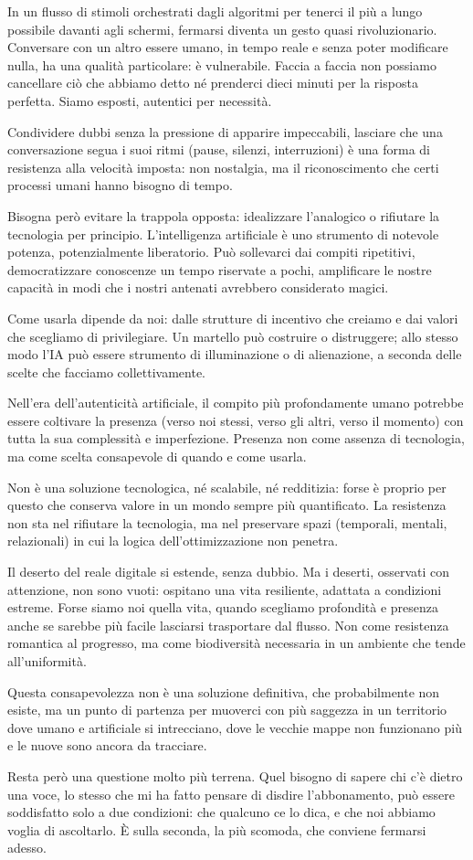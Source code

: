 In un flusso di stimoli orchestrati dagli algoritmi per tenerci il più a lungo possibile davanti agli schermi, fermarsi diventa un gesto quasi rivoluzionario. Conversare con un altro essere umano, in tempo reale e senza poter modificare nulla, ha una qualità particolare: è vulnerabile. Faccia a faccia non possiamo cancellare ciò che abbiamo detto né prenderci dieci minuti per la risposta perfetta. Siamo esposti, autentici per necessità.

Condividere dubbi senza la pressione di apparire impeccabili, lasciare che una conversazione segua i suoi ritmi (pause, silenzi, interruzioni) è una forma di resistenza alla velocità imposta: non nostalgia, ma il riconoscimento che certi processi umani hanno bisogno di tempo.

Bisogna però evitare la trappola opposta: idealizzare l'analogico o rifiutare la tecnologia per principio. L'intelligenza artificiale è uno strumento di notevole potenza, potenzialmente liberatorio. Può sollevarci dai compiti ripetitivi, democratizzare conoscenze un tempo riservate a pochi, amplificare le nostre capacità in modi che i nostri antenati avrebbero considerato magici.

Come usarla dipende da noi: dalle strutture di incentivo che creiamo e dai valori che scegliamo di privilegiare. Un martello può costruire o distruggere; allo stesso modo l'IA può essere strumento di illuminazione o di alienazione, a seconda delle scelte che facciamo collettivamente.

Nell'era dell'autenticità artificiale, il compito più profondamente umano potrebbe essere coltivare la presenza (verso noi stessi, verso gli altri, verso il momento) con tutta la sua complessità e imperfezione. Presenza non come assenza di tecnologia, ma come scelta consapevole di quando e come usarla.

Non è una soluzione tecnologica, né scalabile, né redditizia: forse è proprio per questo che conserva valore in un mondo sempre più quantificato. La resistenza non sta nel rifiutare la tecnologia, ma nel preservare spazi (temporali, mentali, relazionali) in cui la logica dell'ottimizzazione non penetra.

Il deserto del reale digitale si estende, senza dubbio. Ma i deserti, osservati con attenzione, non sono vuoti: ospitano una vita resiliente, adattata a condizioni estreme. Forse siamo noi quella vita, quando scegliamo profondità e presenza anche se sarebbe più facile lasciarsi trasportare dal flusso. Non come resistenza romantica al progresso, ma come biodiversità necessaria in un ambiente che tende all'uniformità.

Questa consapevolezza non è una soluzione definitiva, che probabilmente non esiste, ma un punto di partenza per muoverci con più saggezza in un territorio dove umano e artificiale si intrecciano, dove le vecchie mappe non funzionano più e le nuove sono ancora da tracciare.

Resta però una questione molto più terrena. Quel bisogno di sapere chi c'è dietro una voce, lo stesso che mi ha fatto pensare di disdire l'abbonamento, può essere soddisfatto solo a due condizioni: che qualcuno ce lo dica, e che noi abbiamo voglia di ascoltarlo. È sulla seconda, la più scomoda, che conviene fermarsi adesso.
